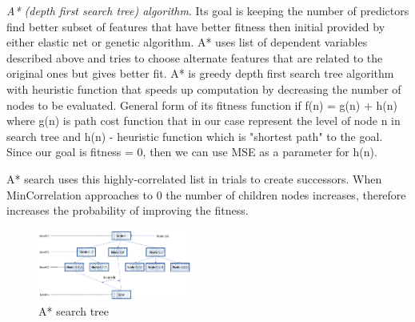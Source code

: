 \documentclass[aps,prl,reprint,amsmath,amssymb,nature]{revtex4-1}
\begin{document}
\blue

\textit{A* (depth first search tree) algorithm}. Its goal is keeping the number of predictors find better subset of features that have better fitness then initial provided by either elastic net or genetic algorithm. A* uses list of dependent variables described above and tries to choose alternate features that are related to the original ones but gives better fit. A* is greedy depth first search tree algorithm with heuristic function that speeds up computation by decreasing the number of nodes to be evaluated. General form of its fitness function if f(n) = g(n) + h(n) where g(n) is path cost function that in our case represent the level of node n in search tree and h(n) - heuristic function which is "shortest path" to the goal. Since our goal is fitness = 0, then we can use MSE as a parameter for h(n). 

A* search uses this highly-correlated list in trials to create successors. When MinCorrelation approaches to 0 the number of children nodes increases, therefore increases the probability of improving the fitness.

\begin{figure}
\includegraphics[width=0.45\textwidth]{media/water_distances_3.eps}
\caption{A* search tree}\label{Fig:A_star_tree}
\end{figure}
\end{document}
